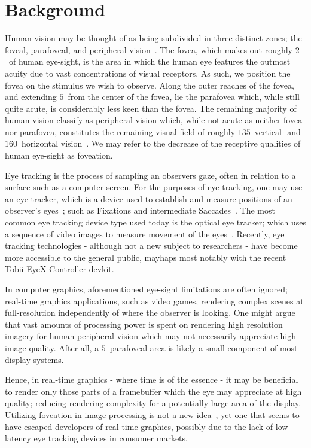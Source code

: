 \section{Background}
Human vision may be thought of as being subdivided in three distinct zones; the foveal, parafoveal, and peripheral vision~\cite{rayner98}.
The fovea, which makes out roughly $2$\degree\ of human eye-sight, is the area in which the human eye features the outmost acuity due to vast concentrations of visual receptors.
As such, we position the fovea on the stimulus we wish to observe.
Along the outer reaches of the fovea, and extending $5$\degree\ from the center of the fovea, lie the parafovea which, while still quite acute, is considerably less keen than the fovea.
The remaining majority of human vision classify as peripheral vision which, while not acute as neither fovea nor parafovea, constitutes the remaining visual field of roughly $135$\degree\ vertical- and $160$\degree\ horizontal vision~\cite{guenter12}.
We may refer to the decrease of the receptive qualities of human eye-sight as foveation.

Eye tracking is the process of sampling an observers gaze, often in relation to a surface such as a computer screen.
For the purposes of eye tracking, one may use an eye tracker, which is a device used to establish and measure positions of an observer's eyes~\cite{duchowski07}; such as Fixations and intermediate Saccades~\cite{rayner98}.
The most common eye tracking device type used today is the optical eye tracker; which uses a sequence of video images to measure movement of the eyes~\cite{duchowski07}.
Recently, eye tracking technologies - although not a new subject to researchers - have become more accessible to the general public, mayhaps most notably with the recent Tobii EyeX Controller devkit.

In computer graphics, aforementioned eye-sight limitations are often ignored; real-time graphics applications, such as video games, rendering complex scenes at full-resolution independently of where the observer is looking.
One might argue that vast amounts of processing power is spent on rendering high resolution imagery for human peripheral vision which may not necessarily appreciate high image quality.
After all, a $5$\degree\ parafoveal area is likely a small component of most display systems.

Hence, in real-time graphics - where time is of the essence - it may be beneficial to render only those parts of a framebuffer which the eye may appreciate at high quality; reducing rendering complexity for a potentially large area of the display.
Utilizing foveation in image processing is not a new idea~\cite{levoy90}, yet one that seems to have escaped developers of real-time graphics, possibly due to the lack of low-latency eye tracking devices in consumer markets.
